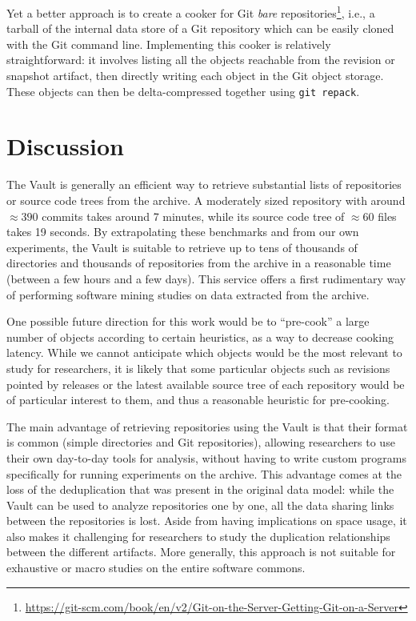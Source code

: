 Yet a better approach is to create a cooker for Git \emph{bare}
repositories\footnote{\url{https://git-scm.com/book/en/v2/Git-on-the-Server-Getting-Git-on-a-Server}},
i.e., a tarball of the internal data store of a Git repository which can be
easily cloned with the Git command line. Implementing this cooker is relatively
straightforward: it involves listing all the objects reachable from the
revision or snapshot artifact, then directly writing each object in the Git
object storage. These objects can then be delta-compressed together using
\texttt{git repack}.

\section{Discussion}

The Vault is generally an efficient way to retrieve substantial lists of
repositories or source code trees from the archive. A moderately sized
repository with around $\approx 390$ commits takes around 7 minutes, while its
source code tree of $\approx 60$ files takes 19 seconds. By extrapolating these
benchmarks and from our own experiments, the Vault is suitable to retrieve up
to tens of thousands of directories and thousands of repositories from the
archive in a reasonable time (between a few hours and a few days). This service
offers a first rudimentary way of performing software mining studies on data
extracted from the archive.

One possible future direction for this work would be to ``pre-cook'' a large
number of objects according to certain heuristics, as a way to decrease cooking
latency. While we cannot anticipate which objects would be the most relevant to
study for researchers, it is likely that some particular objects such as
revisions pointed by releases or the latest available source tree of each
repository would be of particular interest to them, and thus a reasonable
heuristic for pre-cooking.

The main advantage of retrieving repositories using the Vault is that their
format is common (simple directories and Git repositories), allowing
researchers to use their own day-to-day tools for analysis, without having to
write custom programs specifically for running experiments on the archive. This
advantage comes at the loss of the deduplication that was present in the
original data model: while the Vault can be used to analyze repositories one by
one, all the data sharing links between the repositories is lost. Aside from
having implications on space usage, it also makes it challenging for
researchers to study the duplication relationships between the different
artifacts. More generally, this approach is not suitable for exhaustive or
macro studies on the entire software commons.

